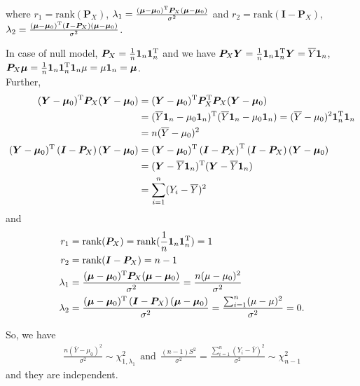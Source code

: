\documentclass[a4paper]{article}
\begin{document}
where $r_{1} = \mathrm{rank}(\bm{P}_{X})$, $\lambda_{1} = \frac{(\bm{\mu} - \bm{\mu}_{0})^{\rm T} \bm{P}_{X} (\bm{\mu} - \bm{\mu}_{0})}{\sigma^2}$ and $r_{2} = \mathrm{rank}(\bm{I} - \bm{P}_{X})$, $\lambda_{2} = \frac{(\bm{\mu} - \bm{\mu}_{0})^{\rm T}\left(\bm{I} - \bm{P}_{X} \right)(\bm{\mu} - \bm{\mu}_{0})}{\sigma^2}$.


In case of null model, $\bm{P}_{X} = \frac{1}{n}\bm{1}_{n}\bm{1}_{n}^{\rm T}$ and we have $\bm{P}_{X}\bm{Y} = \frac{1}{n}\bm{1}_{n}\bm{1}_{n}^{\rm T}\bm{Y} = \overline{Y}\bm{1}_{n}$, $\bm{P}_{X}\bm{\mu} = \frac{1}{n}\bm{1}_{n}\bm{1}_{n}^{\rm T}\bm{1}_{n}\mu = \mu\bm{1}_{n} = \bm{\mu}$.\\

Further,
\begin{align*}
(\bm{Y} - \bm{\mu}_{0})^{\rm T}\bm{P}_{X}(\bm{Y} - \bm{\mu}_{0}) &= (\bm{Y} - \bm{\mu}_{0})^{\rm T}\bm{P}_{X}^{\rm T}\bm{P}_{X}(\bm{Y} - \bm{\mu}_{0})\\
&= (\overline{Y}\bm{1}_{n} - \mu_{0}\bm{1}_{n})^{\rm T}(\overline{Y}\bm{1}_{n} - \mu_{0}\bm{1}_{n}) = (\overline{Y} - \mu_{0})^2 \bm{1}_{n}^{\rm T}\bm{1}_{n}\\
&= n(\overline{Y} - \mu_{0})^2\\
(\bm{Y} - \bm{\mu}_{0})^{\rm T}\left(\bm{I} - \bm{P}_{X} \right)(\bm{Y} - \bm{\mu}_{0}) &= (\bm{Y} - \bm{\mu}_{0})^{\rm T}\left(\bm{I} - \bm{P}_{X} \right)^{\rm T}\left(\bm{I} - \bm{P}_{X} \right)(\bm{Y} - \bm{\mu}_{0})\\
&= (\bm{Y} - \overline{Y}\bm{1}_{n})^{\rm T}(\bm{Y} - \overline{Y}\bm{1}_{n})\\
&= \sum_{i=1}^{n} (Y_{i} - \overline{Y})^{2}
\end{align*}
and
\begin{align*}
r_{1} &= \mathrm{rank}(\bm{P}_{X}) = \mathrm{rank}(\frac{1}{n}\bm{1}_{n}\bm{1}_{n}^{\rm T}) = 1\\
r_{2} &= \mathrm{rank}(\bm{I} - \bm{P}_{X}) = n - 1\\
\lambda_{1} &= \frac{(\bm{\mu} - \bm{\mu}_{0})^{\rm T} \bm{P}_{X} (\bm{\mu} - \bm{\mu}_{0})}{\sigma^2} = \frac{n(\mu - \mu_{0})^2}{\sigma^2}\\
\lambda_{2} &= \frac{(\bm{\mu} - \bm{\mu}_{0})^{\rm T}\left(\bm{I} - \bm{P}_{X} \right)(\bm{\mu} - \bm{\mu}_{0})}{\sigma^2} = \frac{\sum_{i=1}^{n} (\mu - \mu)^{2}}{\sigma^2} = 0.
\end{align*}


So, we have 
\begin{align*}
\frac{n(\overline{Y} - \mu_{0})^2}{\sigma^2} \sim \chi_{1, \lambda_{1}}^2 ~~\mbox{and}~~ \frac{(n-1)S^2}{\sigma^2} = \frac{\sum_{i=1}^{n} (Y_{i} - \overline{Y})^{2}}{\sigma^2} \sim \chi_{n-1}^2
\end{align*}
and they are independent.\\
\end{document}
